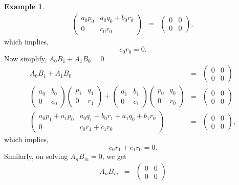 \documentclass[12pt]{amsart}
\theoremstyle{plain}
\theoremstyle{definition}
\newtheorem{example}{Example}[section]
\theoremstyle{remark}
\numberwithin{equation}{section}
\begin{document}
\begin{example}
\begin{eqnarray*}
\begin{pmatrix}
	a_0p_0 & a_0q_0 + b_0r_0 \\ 0 & c_0r_0
\end{pmatrix}&=&\begin{pmatrix}
0 & 0 \\ 0 & 0
\end{pmatrix},
	\end{eqnarray*} which implies, \begin{equation}
	c_0r_0=0.
	\end{equation}
	Now simplify, $A_0B_1+A_1B_0=0$
\begin{eqnarray*}
	A_0B_1 + A_1B_0 &=&
	\begin{pmatrix}
		0 & 0 \\ 0 & 0
	\end{pmatrix} \\
	\begin{pmatrix}
		a_0 & b_0 \\ 0 & c_0
	\end{pmatrix}
	\begin{pmatrix}
		p_1 & q_1 \\ 0 & r_1
	\end{pmatrix}
	+ 
	\begin{pmatrix}
		a_1 & b_1 \\ 0 & c_1
	\end{pmatrix}
	\begin{pmatrix}
		p_0 & q_0 \\ 0 & r_0
	\end{pmatrix}
	&=&
	\begin{pmatrix}
		0 & 0 \\ 0 & 0
	\end{pmatrix} \\
	\begin{pmatrix}
		a_0p_1 + a_1p_0 & a_0q_1 + b_0r_1 + a_1q_0 + b_1r_0 \\ 
		0 & c_0r_1 + c_1r_0
	\end{pmatrix}
	&=&
	\begin{pmatrix}
		0 & 0 \\ 0 & 0
	\end{pmatrix},
\end{eqnarray*}
which implies,
\begin{equation}
	c_0r_1+c_1r_0=0.
\end{equation}Similarly, on solving $A_nB_m=0$, we get \begin{eqnarray*}
A_nB_m&=&\begin{pmatrix}
	0 & 0 \\ 0 & 0
\end{pmatrix}\\

\end{eqnarray*}
\end{example}
\end{document}

